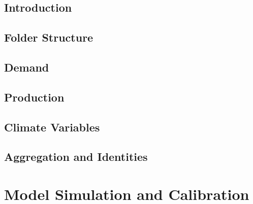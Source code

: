 \documentclass[11pt,aspectratio=169]{beamer}
\begin{document}
\subsection{Introduction}
\subsection{Folder Structure}
\subsection{Demand}
\subsection{Production}
\subsection{Climate Variables}
\subsection{Aggregation and Identities}

\section{Model Simulation and Calibration}
\end{document}
